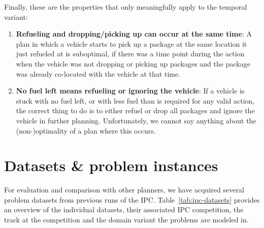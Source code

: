 Finally, these are the properties that only meaningfully apply to the temporal variant:
\begin{enumerate}
\item \textbf{Refueling and dropping/picking up can occur at the same time}: 
A plan in which a vehicle starts to pick up a package at the same location it just refueled at is suboptimal, if there was a time point during the  action
when the vehicle was not dropping or picking up packages and the package was already
co-located with the vehicle at that time.

\item \textbf{No fuel left means refueling or ignoring the vehicle}:
If a vehicle is stuck with no fuel left, or with less fuel than is required for
any valid \drive{} action,
the correct thing to do is to either refuel or drop all packages and ignore the vehicle in further planning. Unfortunately,
we cannot say anything about the (non-)optimality of a plan where this occurs.
\end{enumerate}
















\section{Datasets \& problem instances}\label{datasets}

For evaluation and comparison with other planners, we have acquired several problem datasets from previous runs of the IPC.
Table~\ref{tab:ipc-datasets} provides an overview of the individual datasets, their associated IPC competition, the track at the competition and the domain variant the problems are modeled in.

